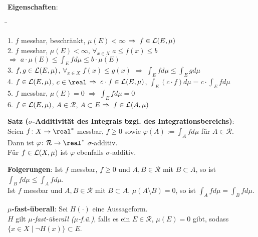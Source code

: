 \textbf{Eigenschaften}:\vspace{-2mm}
\begin{tabbing}
    \hspace{9cm}\=\kill

    1. $f$ messbar, beschränkt, $\mu(E) < \infty$ \>
    $\Rightarrow\; f \in \mathcal{L}(E, \mu)$ \\[2mm]

    2. $f$ messbar, $\mu(E) < \infty$,
    $\forall_{x \in X}\; a \le f(x) \le b$ \>
    $\Rightarrow\; a \cdot \mu(E) \le \int_E f d\mu \le b \cdot \mu(E)$ \\[2mm]

    3. $f, g \in \mathcal{L}(E, \mu)$, $\forall_{x \in X}\; f(x) \le g(x)$ \>
    $\Rightarrow\; \int_E f d\mu \le \int_E g d\mu$ \\[2mm]

    4. $f \in \mathcal{L}(E, \mu)$, $c \in \real$ \>
    $\Rightarrow\; c \cdot f \in \mathcal{L}(E, \mu)$,
    $\int_E (c \cdot f) d\mu = c \cdot \int_E f d\mu$ \\[2mm]

    5. $f$ messbar, $\mu(E) = 0$ \>
    $\Rightarrow\; \int_E f d\mu = 0$ \\[2mm]

    6. $f \in \mathcal{L}(E, \mu)$, $A \in \mathcal{R}$, $A \subset E$ \>
    $\Rightarrow\; f \in \mathcal{L}(A, \mu)$
\end{tabbing}

\linie

\textbf{Satz ($\sigma$-Additivität des Integrals bzgl. des
Integrationsbereichs)}: \\
Seien $f\colon X \rightarrow \real^\ast$ messbar, $f \ge 0$
sowie $\varphi(A) := \int_A f d\mu$ für $A \in \mathcal{R}$. \\
Dann ist $\varphi\colon \mathcal{R} \rightarrow \real^\ast$
$\sigma$-additiv. \\
Für $f \in \mathcal{L}(X, \mu)$ ist $\varphi$ ebenfalls
$\sigma$-additiv.

\textbf{Folgerungen}:
Ist $f$ messbar, $f \ge 0$ und $A, B \in \mathcal{R}$ mit $B \subset A$,
so ist $\int_B f d\mu \le \int_A f d\mu$. \\
Ist $f$ messbar und $A, B \in \mathcal{R}$ mit $B \subset A$,
$\mu(A \setminus B) = 0$, so ist $\int_A f d\mu = \int_B f d\mu$.

\linie

\textbf{$\mu$-fast-überall}:
Sei $H(\cdot)$ eine Aussageform. \\
$H$ gilt \emph{$\mu$-fast-überall ($\mu$-f.ü.)},
falls es ein $E \in \mathcal{R}$, $\mu(E) = 0$
gibt, sodass $\{x \in X \;|\; \lnot H(x)\} \subset E$.

